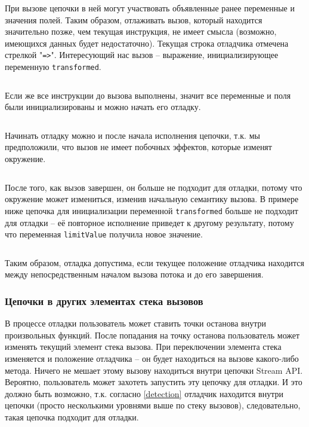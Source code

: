 При вызове цепочки в ней могут участвовать объявленные ранее переменные и значения полей. Таким образом, отлаживать вызов, который находится значительно позже, чем текущая инструкция, не имеет смысла (возможно, имеющихся данных будет недостаточно). Текущая строка отладчика отмечена стрелкой "\texttt{=>}". Интересующий нас вызов -- выражение, инициализирующее переменную \texttt{transformed}.

\inputminted{java}{chapter2/code/FarToCall.java}

Если же все инструкции до вызова выполнены, значит все переменные и поля были инициализированы и можно начать его отладку. 

\inputminted{java}{chapter2/code/BeforeCall.java}

Начинать отладку можно и после начала исполнения цепочки, т.к. мы предположили, что вызов не имеет побочных эффектов, которые изменят окружение.
\inputminted{java}{chapter2/code/InEvaluation.java}

После того, как вызов завершен, он больше не подходит для отладки, потому что окружение может измениться, изменив начальную семантику вызова. В примере ниже цепочка для инициализации переменной \texttt{transformed} больше не подходит для отладки -- её повторное исполнение приведет к другому результату, потому что переменная \texttt{limitValue} получила новое значение.
\inputminted{java}{chapter2/code/AfterCall.java}

Таким образом, отладка допустима, если текущее положение отладчика находится между непосредственным началом вызова потока и до его завершения.

\subsubsection{Цепочки в других элементах стека вызовов}
В процессе отладки пользователь может ставить точки останова внутри произвольных функций. После попадания на точку останова пользователь может изменять текущий элемент стека вызова. При переключении элемента стека изменяется и положение отладчика -- он будет находиться на вызове какого-либо метода. Ничего не мешает этому вызову находиться внутри цепочки Stream API. Вероятно, пользователь может захотеть запустить эту цепочку для отладки. И это должно быть возможно, т.к. согласно \ref{detection} отладчик находится внутри цепочки (просто несколькими уровнями выше по стеку вызовов), следовательно, такая цепочка подходит для отладки.
\inputminted{java}{chapter2/code/NestedMethod.java}

